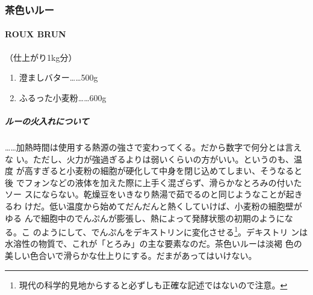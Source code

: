 \maeaki
\begin{recette}
\hypertarget{ux8336ux8272ux3044ux30ebux30fc}{%
\subsubsection{茶色いルー}\label{ux8336ux8272ux3044ux30ebux30fc}}

\hypertarget{roux-brun}{%
\paragraph{ROUX BRUN}\label{roux-brun}}

 

（仕上がり1kg分）

\begin{enumerate}
\def\labelenumi{\arabic{enumi}.}
\tightlist
\item
  澄ましバター\ldots{}\ldots{}500g
\item
  ふるった小麦粉\ldots{}\ldots{}600g
\end{enumerate}

\maeaki

\hypertarget{ux30ebux30fcux306eux706bux5165ux308cux306bux3064ux3044ux3066}{%
\subparagraph{ルーの火入れについて}\label{ux30ebux30fcux306eux706bux5165ux308cux306bux3064ux3044ux3066}}


\ldots{}\ldots{}加熱時間は使用する熱源の強さで変わってくる。だから数字で何分とは言えな
い。ただし、火力が強過ぎるよりは弱いくらいの方がいい。というのも、温度
が高すぎると小麦粉の細胞が硬化して中身を閉じ込めてしまい、そうなると後
でフォンなどの液体を加えた際に上手く混ざらず、滑らかなとろみの付いたソー
スにならない。乾燥豆をいきなり熱湯で茹でるのと同じようなことが起きるわ
けだ。低い温度から始めてだんだんと熱くしていけば、小麦粉の細胞壁がゆる
んで細胞中のでんぷんが膨張し、熱によって発酵状態の初期のようになる。こ
のようにして、でんぷんをデキストリンに変化させる\footnote{現代の科学的見地からすると必ずしも正確な記述ではないので注意。}。デキストリ
ンは水溶性の物質で、これが「とろみ」の主な要素なのだ。茶色いルーは淡褐
色の美しい色合いで滑らかな仕上りにする。だまがあってはいけない。


\end{recette}
